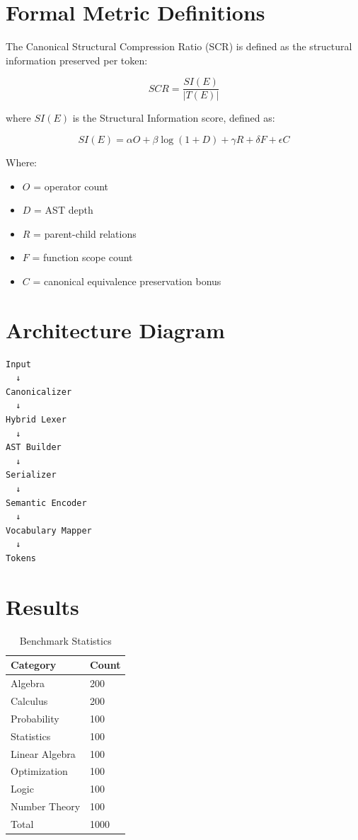 \documentclass{article}
\begin{document}
\section{Formal Metric Definitions}

The Canonical Structural Compression Ratio (SCR) is defined as the structural information preserved per token:

\begin{equation}
    SCR = \frac{SI(E)}{|T(E)|}
\end{equation}

where $SI(E)$ is the Structural Information score, defined as:

\begin{equation}
    SI(E) = \alpha O + \beta \log(1+D) + \gamma R + \delta F + \epsilon C
\end{equation}

Where:
\begin{itemize}
    \item $O$ = operator count
    \item $D$ = AST depth
    \item $R$ = parent-child relations
    \item $F$ = function scope count
    \item $C$ = canonical equivalence preservation bonus
\end{itemize}

\section{Architecture Diagram}

\begin{verbatim}
Input
  ↓
Canonicalizer
  ↓
Hybrid Lexer
  ↓
AST Builder
  ↓
Serializer
  ↓
Semantic Encoder
  ↓
Vocabulary Mapper
  ↓
Tokens
\end{verbatim}

\section{Results}

\begin{table}[h]
\centering
\caption{Benchmark Statistics}
\begin{tabular}{@{}ll@{}}
\toprule
Category & Count \\
\midrule
Algebra & 200 \\
Calculus & 200 \\
Probability & 100 \\
Statistics & 100 \\
Linear Algebra & 100 \\
Optimization & 100 \\
Logic & 100 \\
Number Theory & 100 \\
\midrule
Total & 1000 \\
\bottomrule
\end{tabular}
\end{table}
\end{document}
